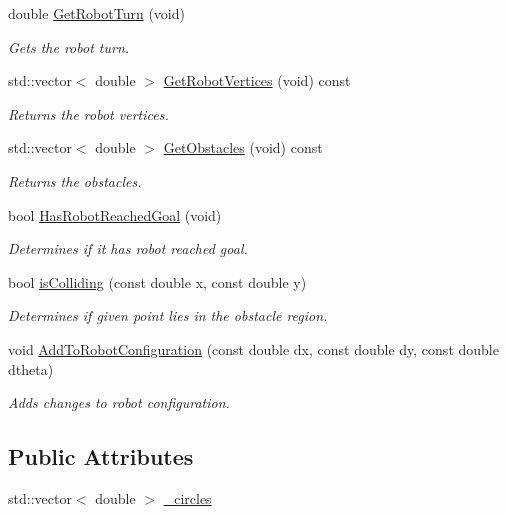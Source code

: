 \begin{DoxyCompactItemize}
double \hyperlink{classRobotSimulator_a3ca3ad525b38e5f0b2ee556916058775}{Get\-Robot\-Turn} (void)
\begin{DoxyCompactList}\small\item\em Gets the robot turn. \end{DoxyCompactList}\item 
std\-::vector$<$ double $>$ \hyperlink{classRobotSimulator_a46889428dbad6da706f451df859c5473}{Get\-Robot\-Vertices} (void) const 
\begin{DoxyCompactList}\small\item\em Returns the robot vertices. \end{DoxyCompactList}\item 
std\-::vector$<$ double $>$ \hyperlink{classRobotSimulator_a28cb2c0a5c2b2f003def7fdcfa8971cf}{Get\-Obstacles} (void) const 
\begin{DoxyCompactList}\small\item\em Returns the obstacles. \end{DoxyCompactList}\item 
bool \hyperlink{classRobotSimulator_a2a4c5f6ce1c2388f02f9006811e6b6e0}{Has\-Robot\-Reached\-Goal} (void)
\begin{DoxyCompactList}\small\item\em Determines if it has robot reached goal. \end{DoxyCompactList}\item 
bool \hyperlink{classRobotSimulator_a564d79ead199c034841eda1b3ebebfcd}{is\-Colliding} (const double x, const double y)
\begin{DoxyCompactList}\small\item\em Determines if given point lies in the obstacle region. \end{DoxyCompactList}\item 
void \hyperlink{classRobotSimulator_a33390e3aa4106ca2e2ee8dd414bdcaea}{Add\-To\-Robot\-Configuration} (const double dx, const double dy, const double dtheta)
\begin{DoxyCompactList}\small\item\em Adds changes to robot configuration. \end{DoxyCompactList}\end{DoxyCompactItemize}
\subsection*{Public Attributes}
\begin{DoxyCompactItemize}
\item 
std\-::vector$<$ double $>$ \hyperlink{classRobotSimulator_a3ce83e536763d1892fb099ba110be183}{\-\_\-circles}
\end{DoxyCompactItemize}


